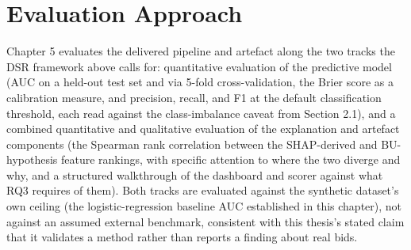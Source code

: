 \hypertarget{evaluation-approach}{%
\section{Evaluation Approach}\label{evaluation-approach}}

Chapter 5 evaluates the delivered pipeline and artefact along the two
tracks the DSR framework above calls for: quantitative evaluation of the
predictive model (AUC on a held-out test set and via 5-fold
cross-validation, the Brier score as a calibration measure, and
precision, recall, and F1 at the default classification threshold, each
read against the class-imbalance caveat from Section 2.1), and a
combined quantitative and qualitative evaluation of the explanation and
artefact components (the Spearman rank correlation between the
SHAP-derived and BU-hypothesis feature rankings, with specific attention
to where the two diverge and why, and a structured walkthrough of the
dashboard and scorer against what RQ3 requires of them). Both tracks are
evaluated against the synthetic dataset's own ceiling (the
logistic-regression baseline AUC established in this chapter), not
against an assumed external benchmark, consistent with this thesis's
stated claim that it validates a method rather than reports a finding
about real bids.
